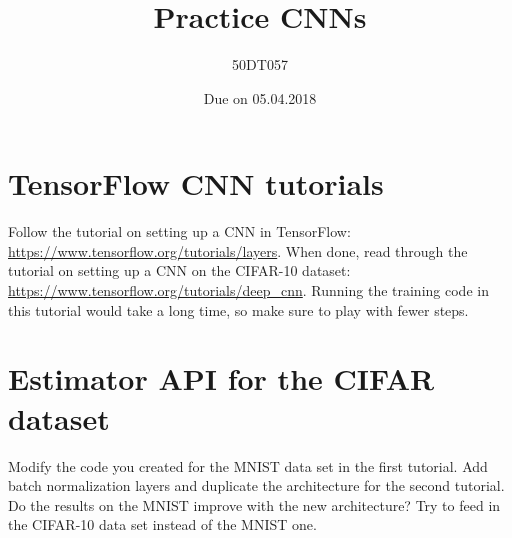\documentclass[savetrees,12pt]{article}
\begin{document}
\title{Practice CNNs}
\author{50DT057}
\date{Due on 05.04.2018}
\maketitle

\section{TensorFlow CNN tutorials}
Follow the tutorial on setting up a CNN in TensorFlow: \url{https://www.tensorflow.org/tutorials/layers}.
When done, read through the tutorial on setting up a CNN on the CIFAR-10 dataset: \url{https://www.tensorflow.org/tutorials/deep_cnn}. Running the training code in this tutorial would take a long time, so make sure to play with fewer steps. 

\section{Estimator API for the CIFAR dataset}
Modify the code you created for the MNIST data set in the first tutorial. Add batch normalization layers and duplicate the architecture for the second tutorial. Do the results on the MNIST improve with the new architecture? Try to feed in the CIFAR-10 data set instead of the MNIST one.
\end{document}
